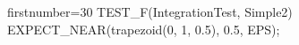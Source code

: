 \begin{cppcode*}{firstnumber=30}
TEST_F(IntegrationTest, Simple2) {
    EXPECT_NEAR(trapezoid(0, 1, 0.5), 0.5, EPS);
}
\end{cppcode*}
